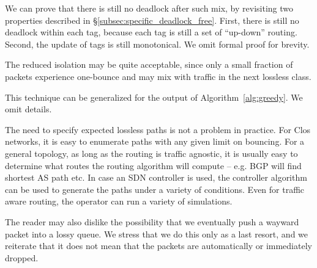 We can prove that there is still no deadlock after such mix, by revisiting two
properties described in \S\ref{subsec:specific_deadlock_free}. First, there is
still no deadlock within each tag, because each tag is still a set of
``up-down'' routing. Second, the update of tags is still monotonical. We omit
formal proof for brevity. 

The reduced isolation may be quite acceptable, since only a small
fraction of packets experience one-bounce and may mix with traffic in the next
lossless class. 

This technique can be generalized for the output of Algorithm~\ref{alg:greedy}.
We omit details.

 The need to specify expected
lossless paths is not a problem in practice. For Clos networks, it is easy to
enumerate paths with any given limit on bouncing. For a general topology, as long
as the routing is traffic agnostic, it is usually easy to determine what routes
the routing algorithm will compute -- e.g. BGP will find shortest AS path etc.
In case an SDN controller is used, the controller algorithm can be used to
generate the paths under a variety of conditions. Even for traffic aware
routing, the operator can run a variety of simulations. 

The reader may also dislike the possibility that we eventually push a wayward
packet into a lossy queue. We stress that we do this only as a last resort, and
we reiterate that it does not mean that the packets are automatically or
immediately dropped. 
